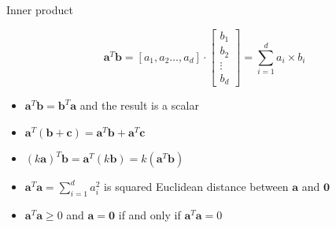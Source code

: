 \documentclass[ignorenonframetext,]{beamer}
\providecommand{\tightlist}{%
  \setlength{\itemsep}{0pt}\setlength{\parskip}{0pt}}
\newcommand{\vv}[1]{\boldsymbol{#1}}
\begin{document}
\begin{frame}{Inner product}
\protect\hypertarget{inner-product}{}

\[\vv{a}^T \vv{b} = [a_1, a_2\ldots, a_d] \cdot \begin{bmatrix}
            b_1 \\
            b_2 \\
           \vdots\\
            b_d
         \end{bmatrix} = \sum_{i=1}^d a_i\times b_i\]

\begin{itemize}
\tightlist
\item
  \(\vv{a}^T \vv{b} = \vv{b}^T\vv{a}\) and the result is a scalar
\item
  \(\vv{a}^T(\vv{b}+\vv{c}) = \vv{a}^T\vv{b}+ \vv{a}^T\vv{c}\)
\item
  \((k\vv{a})^T\vv{b} = \vv{a}^T(k\vv{b})= k(\vv{a}^T\vv{b})\)
\item
  \(\vv{a}^T \vv{a} = \sum_{i=1}^d a_i^2\) is squared Euclidean distance
  between \(\vv{a}\) and \(\vv{0}\)
\item
  \(\vv{a}^T \vv{a} \geq 0\) and \(\vv{a}=\vv{0}\) if and only if
  \(\vv{a}^T\vv{a} =0\)
\end{itemize}

\end{frame}
\end{document}
